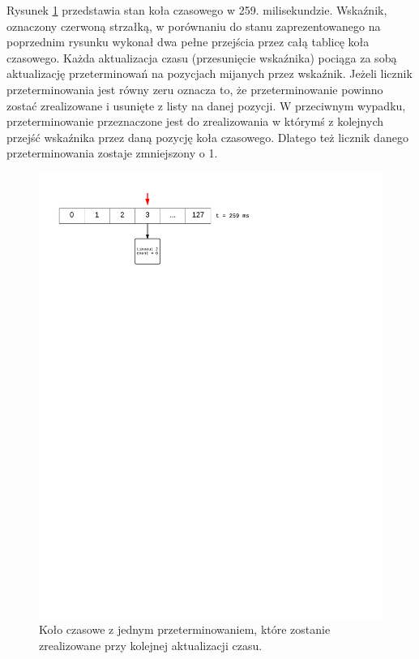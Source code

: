 Rysunek \ref{fig:tiw3} przedstawia stan koła czasowego w 259. milisekundzie.
Wskaźnik, oznaczony czerwoną strzałką, w porównaniu do stanu zaprezentowanego na poprzednim rysunku wykonał dwa pełne przejścia przez całą tablicę koła czasowego.
Każda aktualizacja czasu (przesunięcie wskaźnika) pociąga za sobą aktualizację przeterminowań na pozycjach mijanych przez wskaźnik.
Jeżeli licznik przeterminowania jest równy zeru oznacza to, że przeterminowanie powinno zostać zrealizowane i usunięte z listy na danej pozycji.
W przeciwnym wypadku, przeterminowanie przeznaczone jest do zrealizowania w którymś z kolejnych przejść wskaźnika przez daną pozycję koła czasowego. Dlatego też licznik danego przeterminowania zostaje zmniejszony o 1.

\begin{figure}[h]
\centerline{\includegraphics[scale=0.75, clip, trim=10mm 220mm 80mm 10mm]{tiw3}}
\caption{Koło czasowe z jednym przeterminowaniem, które zostanie zrealizowane przy kolejnej aktualizacji czasu.}
\label{fig:tiw3}
\end{figure}

